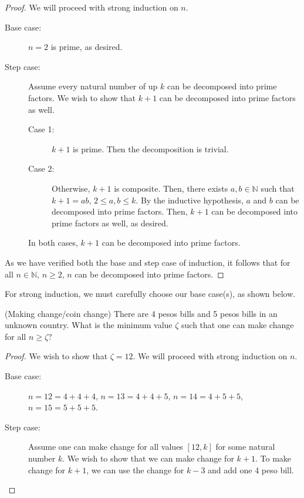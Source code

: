 \documentclass[a4paper]{article}
\begin{document}
\begin{proof}
	We will proceed with strong induction on \( n \).
	\begin{description}
		\item[Base case:] \( n=2 \) is prime, as desired.
		\item[Step case:] Assume every natural number of up \( k \) can be decomposed into prime factors. We wish to show that \( k+1 \) can be decomposed into prime factors as well.
			\begin{description}
				\item[Case 1:] \( k+1 \) is prime. Then the decomposition is trivial.
				\item[Case 2:] Otherwise, \( k+1 \) is composite. Then, there exists \( a, b \in \mathbb{N} \) such that \( k+1 = ab \), \( 2\le a,b\le k \). By the inductive hypothesis, \( a \) and \( b \) can be decomposed into prime factors. Then, \( k+1 \) can be decomposed into prime factors as well, as desired.
			\end{description}
			In both cases, \( k+1 \) can be decomposed into prime factors.
	\end{description}
	As we have verified both the base and step case of induction, it follows that for all \( n\in \mathbb{N} \), \( n\ge 2 \), \( n \) can be decomposed into prime factors.
\end{proof}

\begin{note}
	For strong induction, we must carefully choose our base case(s), as shown below.
\end{note}

\begin{eg}
	(Making change/coin change) There are 4 pesos bills and 5 pesos bills in an unknown country. What is the minimum value \( \zeta \) such that one can make change for all \( n \ge \zeta \)?
\end{eg}

\begin{proof}
	We wish to show that \( \zeta=12 \). We will proceed with strong induction on \( n \).
	\begin{description}
		\item[Base case:] \( n=12=4+4+4 \), \( n=13=4+4+5 \), \( n=14=4+5+5 \), \( n=15=5+5+5 \).
		\item[Step case:] Assume one can make change for all values \( [12, k] \) for some natural number \( k \). We wish to show that we can make change for \( k+1 \). To make change for \( k+1 \), we can use the change for \( k-3 \) and add one 4 peso bill.
	\end{description}
\end{proof}
\end{document}
